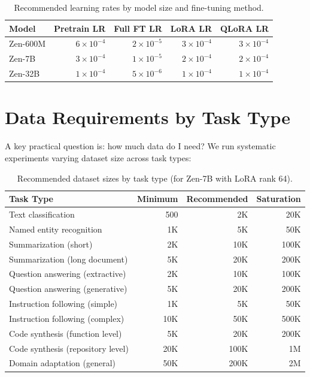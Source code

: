 \documentclass[11pt,a4paper]{article}
\begin{document}
\begin{table}[H]
\centering
\begin{tabular}{lrrrr}
\toprule
\textbf{Model} & \textbf{Pretrain LR} & \textbf{Full FT LR} & \textbf{LoRA LR} & \textbf{QLoRA LR} \\
\midrule
Zen-600M & $6\times10^{-4}$ & $2\times10^{-5}$ & $3\times10^{-4}$ & $3\times10^{-4}$ \\
Zen-7B & $3\times10^{-4}$ & $1\times10^{-5}$ & $2\times10^{-4}$ & $2\times10^{-4}$ \\
Zen-32B & $1\times10^{-4}$ & $5\times10^{-6}$ & $1\times10^{-4}$ & $1\times10^{-4}$ \\
\bottomrule
\end{tabular}
\caption{Recommended learning rates by model size and fine-tuning method.}
\end{table}

\section{Data Requirements by Task Type}

A key practical question is: how much data do I need? We run systematic experiments
varying dataset size across task types:

\begin{table}[H]
\centering
\begin{tabular}{lrrr}
\toprule
\textbf{Task Type} & \textbf{Minimum} & \textbf{Recommended} & \textbf{Saturation} \\
\midrule
Text classification & 500 & 2K & 20K \\
Named entity recognition & 1K & 5K & 50K \\
Summarization (short) & 2K & 10K & 100K \\
Summarization (long document) & 5K & 20K & 200K \\
Question answering (extractive) & 2K & 10K & 100K \\
Question answering (generative) & 5K & 20K & 200K \\
Instruction following (simple) & 1K & 5K & 50K \\
Instruction following (complex) & 10K & 50K & 500K \\
Code synthesis (function level) & 5K & 20K & 200K \\
Code synthesis (repository level) & 20K & 100K & 1M \\
Domain adaptation (general) & 50K & 200K & 2M \\
\bottomrule
\end{tabular}
\caption{Recommended dataset sizes by task type (for Zen-7B with LoRA rank 64).}
\end{table}
\end{document}
